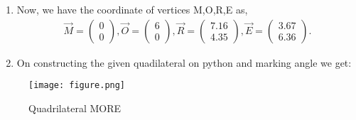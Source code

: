 \documentclass[journal,12pt,twocolumn]{IEEEtran}
\newcommand{\myvec}[1]{\ensuremath{\begin{pmatrix}#1\end{pmatrix}}}
\begin{document}
\begin{enumerate}
\begin{proof}
 \begin{align}
     \implies \vec{E}= \myvec{0\\0}+\myvec{3.67\\6.36}
 \end{align}
 \begin{align}
     \vec{E}= \myvec{3.67\\6.36}
 \end{align}
 \end{proof}
 \item Now, we have the coordinate of vertices M,O,R,E as,
\begin{align}
\vec{M}= \myvec{0 \\ 0}, \vec{O}= \myvec{6 \\ 0},  \vec{R}= \myvec{7.16 \\ 4.35}, \vec{E}= \myvec{3.67 \\ 6.36}.
\end{align}    
    \item On constructing the given quadilateral on python and marking angle we get:
\end{enumerate}
\begin{figure}[!ht]
\texttt{[image: figure.png]}
\caption{Quadrilateral MORE}
\label{fig:Quadrilateral MORE}	
\end{figure}
\end{document}
